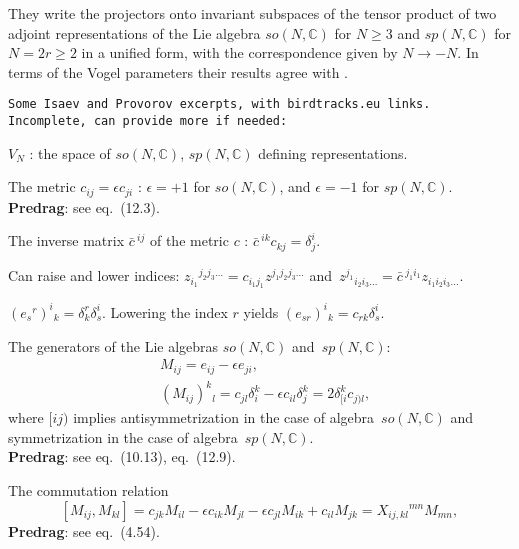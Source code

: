 \begin{description}
They write the projectors onto invariant subspaces of the tensor product
of two adjoint representations of the Lie algebra $so(N,\mathbb{C})$ for
$N\ge 3$ and $sp(N,\mathbb{C})$ for $N=2r\ge 2$ in a unified form, with
the correspondence given by $N\to -N$. In terms of the Vogel parameters
their results agree with .
\bigskip

\item[2021-01-02 Predrag]
\texttt{Some Isaev and Provorov excerpts, with birdtracks.eu links.
Incomplete, can provide more if needed:}

$V_N$ : the space of $so(N,\mathbb{C})$, $sp(N,\mathbb{C})$ defining
representations.

The metric $c_{ij}=\epsilon c_{ji}$ : $\epsilon=+1$
for $so(N,\mathbb{C})$, and $\epsilon=-1$ for $sp(N,\mathbb{C})$.
\\{\bf Predrag}: see
 {eq.~(12.3)}.

The inverse matrix $\bar{c}\,^{ij}$ of the metric $c$ :
$\bar{c}\,^{ik}c_{kj}=\delta^i_j$.

Can raise and lower indices:
$z_{i_1}{}^{j_2j_3\dots}=c_{i_1j_1}z^{j_1j_2j_3\dots}$
and~$z^{j_1}{}_{i_2i_3\dots}=\bar{c}\,^{j_1i_1}z_{i_1i_2i_3\dots}$.

$(e_s{}^r)^i{}_k=\delta^r_k\delta^i_s$.
Lowering the index $r$ yields
$(e_{sr})^i{}_k=c_{rk}\delta^i_s$.

The generators of the
Lie algebras $so(N,\mathbb{C})$ and~$sp(N,\mathbb{C})$:
\begin{align}
\label{eq2.2}
&M_{ij}=e_{ij}-\epsilon e_{ji},\\
&(M_{ij})^k{}_l=c_{jl}\delta^k_i-\epsilon c_{il}\delta^k_j=2\delta_{[i}^kc_{j)l},
\label{eq2.3}
\end{align}
where $[ij)$ implies antisymmetrization in the case of
algebra~$so(N,\mathbb{C})$ and symmetrization in the case of
algebra~$sp(N,\mathbb{C})$.
\\{\bf Predrag}: see
 {eq.~(10.13)},
 {eq.~(12.9)}.


The commutation relation
\begin{equation}
\label{eq2.4}
[M_{ij},M_{kl}]=c_{jk}M_{il}-\epsilon c_{ik}M_{jl}-\epsilon c_{jl}M_{ik}+c_{il}M_{jk}=X_{ij,kl}{}^{mn}M_{mn},
\end{equation}
{\bf Predrag}: see
 {eq.~(4.54)}.


\end{description}
